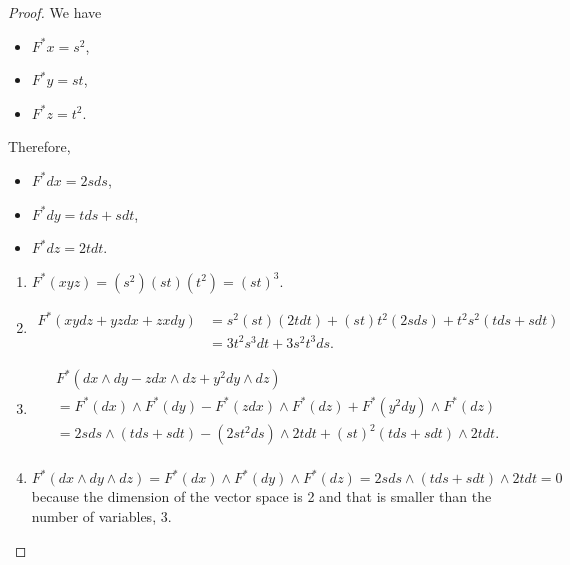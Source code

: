 \documentclass[12pt, psamsfonts]{amsart}
\theoremstyle{definition}
\theoremstyle{remark}
\numberwithin{equation}{section}
\begin{document}
\begin{proof}
  We have
  \begin{itemize}
    \item
      $F^*x = s^2$,
    \item
      $F^*y = st$,
    \item
      $F^*z = t^2$.
  \end{itemize}

  Therefore, 
  \begin{itemize}
    \item
      $F^*dx = 2sds$,
    \item
      $F^*dy = tds + sdt$,
    \item
      $F^*dz = 2tdt$.
  \end{itemize}

  \begin{enumerate}
    \item
      $F^*(xyz) = (s^2)(st)(t^2) = (st)^3$.
    \item
      \begin{align*}
        F^*(xydz + yzdx + zxdy)
          &= s^2(st)(2tdt) + (st)t^2(2sds) + t^2s^2(tds + sdt) \\
          &= 3t^2s^3dt + 3s^2t^3ds.
      \end{align*}
    \item
      \begin{align*}
        &F^*(dx \wedge dy - zdx \wedge dz + y^2dy \wedge dz) \\
          &= F^*(dx) \wedge F^*(dy) - F^*(zdx) \wedge F^*(dz) + F^*(y^2dy) \wedge F^*(dz) \\
          &= 2sds \wedge (tds + sdt) - (2st^2ds) \wedge 2tdt + (st)^2(tds + sdt) \wedge 2tdt. \\
      \end{align*}
    \item
      $F^*(dx \wedge dy \wedge dz) = F^*(dx) \wedge F^*(dy) \wedge F^*(dz) = 2sds \wedge (tds + sdt) \wedge 2tdt = 0$ because the dimension of the vector space is 2 and that is smaller than the number of variables, 3.
  \end{enumerate}
\end{proof}
\end{document}
